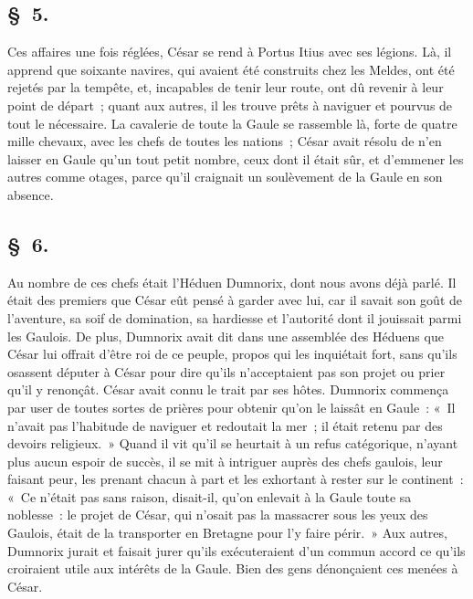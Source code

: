 \documentclass[french,twoside]{book} %
\begin{document}
\subsection[{§ 5.}]{ \textsc{§ 5.} }
\noindent Ces affaires une fois réglées, César se rend à Portus Itius avec ses légions. Là, il apprend que soixante navires, qui avaient été construits chez les Meldes, ont été rejetés par la tempête, et, incapables de tenir leur route, ont dû revenir à leur point de départ ; quant aux autres, il les trouve prêts à naviguer et pourvus de tout le nécessaire. La cavalerie de toute la Gaule se rassemble là, forte de quatre mille chevaux, avec les chefs de toutes les nations ; César avait résolu de n’en laisser en Gaule qu’un tout petit nombre, ceux dont il était sûr, et d’emmener les autres comme otages, parce qu’il craignait un soulèvement de la Gaule en son absence.
\subsection[{§ 6.}]{ \textsc{§ 6.} }
\noindent Au nombre de ces chefs était l’Héduen Dumnorix, dont nous avons déjà parlé. Il était des premiers que César eût pensé à garder avec lui, car il savait son goût de l’aventure, sa soif de domination, sa hardiesse et l’autorité dont il jouissait parmi les Gaulois. De plus, Dumnorix avait dit dans une assemblée des Héduens que César lui offrait d’être roi de ce peuple, propos qui les inquiétait fort, sans qu’ils osassent députer à César pour dire qu’ils n’acceptaient pas son projet ou prier qu’il y renonçât. César avait connu le trait par ses hôtes. Dumnorix commença par user de toutes sortes de prières pour obtenir qu’on le laissât en Gaule : « Il n’avait pas l’habitude de naviguer et redoutait la mer ; il était retenu par des devoirs religieux. » Quand il vit qu’il se heurtait à un refus catégorique, n’ayant plus aucun espoir de succès, il se mit à intriguer auprès des chefs gaulois, leur faisant peur, les prenant chacun à part et les exhortant à rester sur le continent : « Ce n’était pas sans raison, disait-il, qu’on enlevait à la Gaule toute sa noblesse : le projet de César, qui n’osait pas la massacrer sous les yeux des Gaulois, était de la transporter en Bretagne pour l’y faire périr. » Aux autres, Dumnorix jurait et faisait jurer qu’ils exécuteraient d’un commun accord ce qu’ils croiraient utile aux intérêts de la Gaule. Bien des gens dénonçaient ces menées à César.
\end{document}
